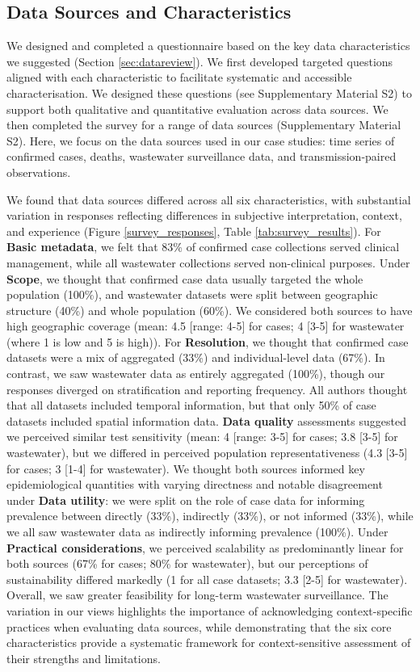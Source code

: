 \documentclass{article}
\begin{document}
\subsection{Data Sources and Characteristics}

We designed and completed a questionnaire based on the key data characteristics we suggested (Section \ref{sec:datareview}). We first developed targeted questions aligned with each characteristic to facilitate systematic and accessible characterisation. We designed these questions (see Supplementary Material S2) to support both qualitative and quantitative evaluation across data sources. We then completed the survey for a range of data sources (Supplementary Material S2). Here, we focus on the data sources used in our case studies: time series of confirmed cases, deaths, wastewater surveillance data, and transmission-paired observations.

We found that data sources differed across all six characteristics, with substantial variation in responses reflecting differences in subjective interpretation, context, and experience (Figure \ref{survey_responses}, Table \ref{tab:survey_results}). For \textbf{Basic metadata}, we felt that 83\% of confirmed case collections served clinical management, while all wastewater collections served non-clinical purposes. Under \textbf{Scope}, we thought that confirmed case data usually targeted the whole population (100\%),  and wastewater datasets were split between geographic structure (40\%) and whole population (60\%). We considered both sources to have high geographic coverage (mean: 4.5 [range: 4-5] for cases; 4 [3-5] for wastewater (where 1 is low and 5 is high)). For \textbf{Resolution}, we thought that confirmed case datasets were a mix of aggregated (33\%) and individual-level data (67\%). In contrast, we saw wastewater data as entirely aggregated (100\%), though our responses diverged on stratification and reporting frequency. All authors thought that all datasets included temporal information, but that only 50\% of case datasets included spatial information data. \textbf{Data quality} assessments suggested we perceived similar test sensitivity (mean: 4 [range: 3-5] for cases; 3.8 [3-5] for wastewater), but we differed in perceived population representativeness (4.3 [3-5] for cases; 3 [1-4] for wastewater). We thought both sources informed key epidemiological quantities with varying directness and notable disagreement under \textbf{Data utility}: we were split on the role of case data for informing prevalence between directly (33\%), indirectly (33\%), or not informed (33\%), while we all saw wastewater data as indirectly informing prevalence (100\%). Under \textbf{Practical considerations}, we perceived scalability as predominantly linear for both sources (67\% for cases; 80\% for wastewater), but our perceptions of sustainability differed markedly (1 for all case datasets; 3.3 [2-5] for wastewater). Overall, we saw greater feasibility for long-term wastewater surveillance. The variation in our views highlights the importance of acknowledging context-specific practices when evaluating data sources, while demonstrating that the six core characteristics provide a systematic framework for context-sensitive assessment of their strengths and limitations.
\end{document}
